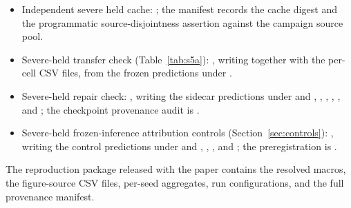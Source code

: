 \documentclass[letterpaper,onecolumn,11pt,journal]{IEEEtran}
\begin{document}
\begin{itemize}
  manifest; it is never an input feature of any model.
  \item Independent severe held cache:
  ; the manifest records the cache
  digest and the programmatic source-disjointness assertion against the
  campaign source pool.
  \item Severe-held transfer check (Table~\ref{tab:s5a}):
  , writing
   together with
  the per-cell CSV files, from the frozen predictions under
  .
  \item Severe-held repair check:
  , writing the
  sidecar predictions under
   and
  , ,
  , ,
  , and ; the
  checkpoint provenance audit is .
  \item Severe-held frozen-inference attribution controls
  (Section~\ref{sec:controls}):
  , writing the
  control predictions under  and
  , ,
  , and
  ; the preregistration is
  .
\end{itemize}

The reproduction package released with the paper contains the resolved macros,
the figure-source CSV files, per-seed aggregates, run configurations, and the
full provenance manifest.
\end{document}
